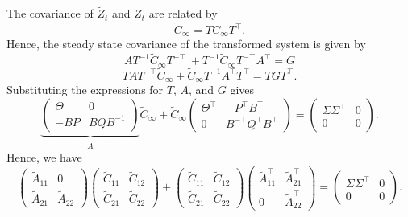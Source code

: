 \documentclass[11pt]{article}
\begin{document}
The covariance of $\widetilde{Z}_t$ and $Z_t$ are related by
\begin{equation}
    \widetilde{C}_\infty = TC_\infty
    T^\top.
\end{equation}
Hence, the steady state covariance of the transformed system is given by
\begin{equation}
    AT^{-1}\widetilde{C}_\infty T^{-\top} \
    +T^{-1}\widetilde{C}_\infty T^{-\top} A^{\top}
    =G
\end{equation}
\begin{equation}
    TAT^{-\top}\widetilde{C}_\infty + \widetilde{C}_\infty T^{-1}A^{\top}T^{\top} = TGT^\top.
\end{equation}
Substituting the expressions for $T$, $A$, and $G$ gives
\begin{equation}
    \underbrace{\begin{pmatrix}
            \Theta & 0        \\
            -BP    & BQB^{-1}
        \end{pmatrix}}_{\widetilde{A}}\widetilde{C}_\infty
    +\widetilde{C}_\infty
    \begin{pmatrix}
        \Theta^{\top} & -P^\top B^{\top}       \\
        0             & B^{-\top}Q^\top B^\top
    \end{pmatrix}
    =\begin{pmatrix}
        \Sigma\Sigma^\top & 0 \\
        0                 & 0
    \end{pmatrix}.
\end{equation}
Hence, we have
\begin{equation}
    \begin{pmatrix}
        \widetilde{A}_{11} & 0                  \\
        \widetilde{A}_{21} & \widetilde{A}_{22}
    \end{pmatrix}
    \begin{pmatrix}
        \widetilde{C}_{11} & \widetilde{C}_{12} \\
        \widetilde{C}_{21} & \widetilde{C}_{22}
    \end{pmatrix}
    +\begin{pmatrix}
        \widetilde{C}_{11} & \widetilde{C}_{12} \\
        \widetilde{C}_{21} & \widetilde{C}_{22}
    \end{pmatrix}
    \begin{pmatrix}
        \widetilde{A}_{11}^\top & \widetilde{A}_{21}^\top \\
        0                       & \widetilde{A}_{22}^\top
    \end{pmatrix}
    =\begin{pmatrix}
        \Sigma\Sigma^\top & 0 \\
        0                 & 0
    \end{pmatrix}.
\end{equation}
\end{document}
